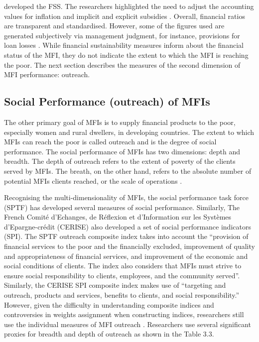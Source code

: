 \documentclass[a4paper, nobind]{templates/ociamthesis}
\begin{document}
\textcite{christen2001commercialization} developed the FSS. The researchers highlighted the need to adjust the accounting values for inflation and implicit and explicit subsidies \autocite{mersland2014microfinance}. Overall, financial ratios are transparent and standardised. However, some of the figures used are generated subjectively via management judgment, for instance, provisions for loan losses \autocite{ehrhardt2016corporate}. While financial sustainability measures inform about the financial status of the MFI, they do not indicate the extent to which the MFI is reaching the poor. The next section describes the measures of the second dimension of MFI performance: outreach.

\hypertarget{social-performance-outreach-of-mfis}{%
\subsection{Social Performance (outreach) of MFIs}\label{social-performance-outreach-of-mfis}}

The other primary goal of MFIs is to supply financial products to the poor, especially women and rural dwellers, in developing countries. The extent to which MFIs can reach the poor is called outreach and is the degree of social performance. The social performance of MFIs has two dimensions: depth and breadth. The depth of outreach refers to the extent of poverty of the clients served by MFIs. The breath, on the other hand, refers to the absolute number of potential MFIs clients reached, or the scale of operations \autocite{bibi2018new}.

Recognising the multi-dimensionality of MFIs, the social performance task force (SPTF) has developed several measures of social performance. Similarly, The French Comité d'Echanges, de Réflexion et d'Information sur les Systèmes d'Epargne-crédit (CERISE) also developed a set of social performance indicators (SPI)\autocite{mersland2014microfinance}. The SPTF outreach composite index takes into account the ``provision of financial services to the poor and the financially excluded, improvement of quality and appropriateness of financial services, and improvement of the economic and social conditions of clients. The index also considers that MFIs must strive to ensure social responsibility to clients, employees, and the community served''\autocite{mersland2009performance}. Similarly, the CERISE SPI composite index makes use of ``targeting and outreach, products and services, benefits to clients, and social responsibility.'' However, given the difficulty in understanding composite indices and controversies in weights assignment when constructing indices, researchers still use the individual measures of MFI outreach \autocite{chattopadhyay2017applicability}. Researchers use several significant proxies for breadth and depth of outreach as shown in the Table 3.3.
\end{document}
